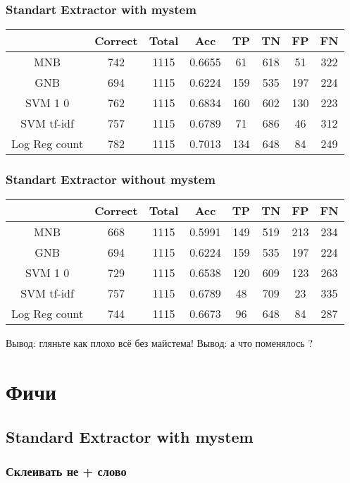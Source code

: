 \documentclass[a4paper, 12pt]{article}
\theoremstyle{plain}
\theoremstyle{definition}
\theoremstyle{remark}
\begin{document}
\subsubsection{Standart Extractor with mystem}
\begin{tabular}{|c|c|c|c|c|c|c|c|}
\hline
  ~~~~ & Correct & Total & Acc & TP & TN & FP & FN \\
  \hline
  MNB & 742 & 1115 & 0.6655 & 61 & 618 & 51 & 322  \\
  \hline
  GNB & 694 & 1115 & 0.6224 & 159 & 535 & 197 & 224 \\
  \hline
  SVM 1 0 & 762 & 1115 & 0.6834 & 160 & 602 & 130 & 223 \\
  \hline
  SVM tf-idf & 757 & 1115 & 0.6789 & 71 & 686 & 46 & 312 \\
  \hline
  Log Reg count & 782 & 1115 & 0.7013 & 134 & 648 & 84 & 249 \\
\hline
\end{tabular}


\subsubsection{Standart Extractor without mystem}
\begin{tabular}{|c|c|c|c|c|c|c|c|}
\hline
  ~~~~ & Correct & Total & Acc & TP & TN & FP & FN \\
  \hline
  MNB & 668 & 1115 & 0.5991 & 149 & 519 & 213 & 234  \\
  \hline
  GNB & 694 & 1115 & 0.6224 & 159 & 535 & 197 & 224 \\
  \hline
  SVM 1 0 & 729 & 1115 & 0.6538 & 120 & 609 & 123 & 263 \\
  \hline
  SVM tf-idf & 757 & 1115 & 0.6789 & 48 & 709 & 23 & 335 \\
  \hline
  Log Reg count & 744 & 1115 & 0.6673 & 96 & 648 & 84 & 287 \\
\hline
\end{tabular}

Вывод: гляньте как плохо всё без майстема! Вывод: а что поменялось ?

\section{Фичи}
\subsection{Standard Extractor with mystem}
\subsubsection{Склеивать не + слово}
\end{document}
